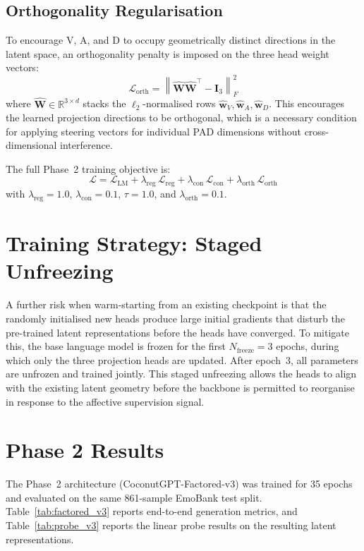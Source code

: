 \documentclass[12pt,twoside]{report}
\begin{document}
\subsection{Orthogonality Regularisation}

To encourage V, A, and D to occupy geometrically distinct directions in the latent space, an orthogonality penalty is imposed on the three head weight vectors:
\[
    \mathcal{L}_{\text{orth}} = \left\| \hat{\mathbf{W}}\hat{\mathbf{W}}^\top - \mathbf{I}_3 \right\|_F^2
\]
where $\hat{\mathbf{W}} \in \mathbb{R}^{3 \times d}$ stacks the $\ell_2$-normalised rows $\hat{\mathbf{w}}_V, \hat{\mathbf{w}}_A, \hat{\mathbf{w}}_D$.
This encourages the learned projection directions to be orthogonal, which is a necessary condition for applying steering vectors for individual PAD dimensions without cross-dimensional interference.

The full Phase~2 training objective is:
\[
    \mathcal{L} = \mathcal{L}_{\text{LM}}
    + \lambda_{\text{reg}}\,\mathcal{L}_{\text{reg}}
    + \lambda_{\text{con}}\,\mathcal{L}_{\text{con}}
    + \lambda_{\text{orth}}\,\mathcal{L}_{\text{orth}}
\]
with $\lambda_{\text{reg}} = 1.0$, $\lambda_{\text{con}} = 0.1$, $\tau = 1.0$, and $\lambda_{\text{orth}} = 0.1$.

\section{Training Strategy: Staged Unfreezing}

A further risk when warm-starting from an existing checkpoint is that the randomly initialised new heads produce large initial gradients that disturb the pre-trained latent representations before the heads have converged.
To mitigate this, the base language model is frozen for the first $N_{\text{freeze}} = 3$ epochs, during which only the three projection heads are updated.
After epoch~3, all parameters are unfrozen and trained jointly.
This staged unfreezing allows the heads to align with the existing latent geometry before the backbone is permitted to reorganise in response to the affective supervision signal.

\section{Phase 2 Results}

The Phase~2 architecture (CoconutGPT-Factored-v3) was trained for 35 epochs and evaluated on the same 861-sample EmoBank test split.
Table~\ref{tab:factored_v3} reports end-to-end generation metrics, and Table~\ref{tab:probe_v3} reports the linear probe results on the resulting latent representations.
\end{document}
